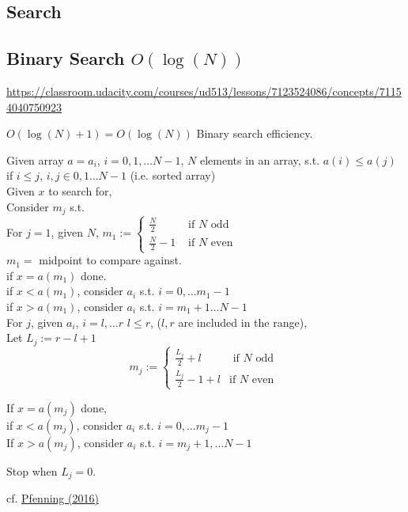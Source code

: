 \documentclass[10pt]{amsart}
\begin{document}
\begin{multicols*}{2}
\section{Search}

\subsection{Binary Search $O(\log{(N)})$}

\url{https://classroom.udacity.com/courses/ud513/lessons/7123524086/concepts/71154040750923}

$O(\log{(N)} + 1) = O(\log{(N)})$ Binary search efficiency.

Given array $a=a_i$, $i=0,1,\dots N-1$, $N$ elements in an array, s.t. $a(i) \leq a(j)$ if $i\leq j$, $i,j \in 0, 1\dots N-1$ (i.e. sorted array) \\
Given $x$ to search for, \\
Consider $m_j$ s.t. \\
For $j=1$, given $N$, $m_1 := \begin{cases} \frac{N}{2} & \text{ if $N$ odd } \\
\frac{N}{2} -1 & \text{ if $N$ even } \end{cases} $ \\

$m_1=$ midpoint to compare against. \\


if $x=a(m_1)$ done. \\
if $x< a(m_1)$, consider $a_i$ s.t. $i=0, \dots m_1-1$ \\
if $x>a(m_1)$, consider $a_i$ s.t. $i=m_1+1 \dots N-1$ \\

For $j$, given $a_i$, $i=l, \dots r$ $l\leq r$, ($l, r$ are included in the range), \\
Let $L_j := r - l +1$ \\
\[
m_j := \begin{cases} \frac{L_j}{2} + l & \text{ if $N$ odd } \\
	\frac{L_j}{2} - 1 + l & \text{if $N$ even } \end{cases} 
\]

If $x=a(m_j)$ done, \\
if $x<a(m_j)$, consider $a_i$ s.t. $i=0,\dots m_j -1$ \\
If $x> a(m_j)$, consider $a_i$ s.t. $i=m_j+1, \dots N-1$ 

Stop when $L_j=0$.

cf. \href{https://web2.qatar.cmu.edu/~mhhammou/15122-s16/lectures/06-binsearch.pdf}{Pfenning (2016)}


\end{multicols*}
\end{document}
